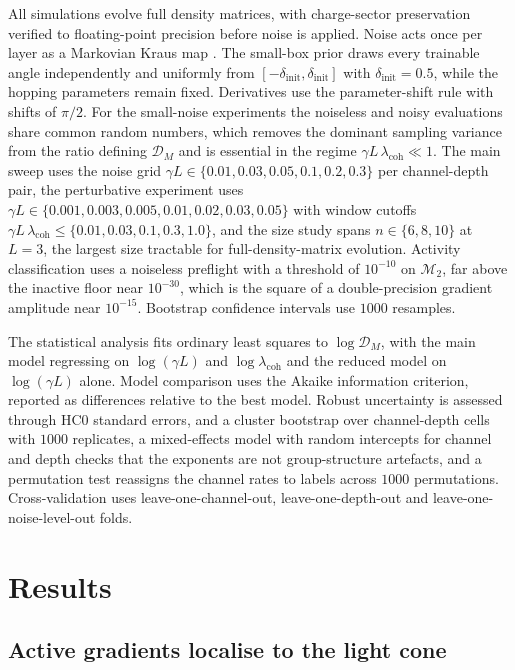 \documentclass{article}
\newcommand{\Mtwo}{\mathcal{M}_2}
\newcommand{\DM}{\mathcal{D}_M}
\newcommand{\lcoh}{\lambda_{\mathrm{coh}}}
\begin{document}
All simulations evolve full density matrices, with charge-sector preservation verified to floating-point precision before noise is applied. Noise acts once per layer as a Markovian Kraus map \cite{lindblad1976,gks1976,breuerpetruccione2002,nielsenchuang2010}. The small-box prior draws every trainable angle independently and uniformly from $[-\delta_{\mathrm{init}},\delta_{\mathrm{init}}]$ with $\delta_{\mathrm{init}}=0.5$, while the hopping parameters remain fixed. Derivatives use the parameter-shift rule with shifts of $\pi/2$. For the small-noise experiments the noiseless and noisy evaluations share common random numbers, which removes the dominant sampling variance from the ratio defining $\DM$ and is essential in the regime $\gamma L\,\lcoh\ll1$. The main sweep uses the noise grid $\gamma L\in\{0.01,0.03,0.05,0.1,0.2,0.3\}$ per channel-depth pair, the perturbative experiment uses $\gamma L\in\{0.001,0.003,0.005,0.01,0.02,0.03,0.05\}$ with window cutoffs $\gamma L\,\lcoh\leq\{0.01,0.03,0.1,0.3,1.0\}$, and the size study spans $n\in\{6,8,10\}$ at $L=3$, the largest size tractable for full-density-matrix evolution. Activity classification uses a noiseless preflight with a threshold of $10^{-10}$ on $\Mtwo$, far above the inactive floor near $10^{-30}$, which is the square of a double-precision gradient amplitude near $10^{-15}$. Bootstrap confidence intervals use $1000$ resamples.

The statistical analysis fits ordinary least squares to $\log\DM$, with the main model regressing on $\log(\gamma L)$ and $\log\lcoh$ and the reduced model on $\log(\gamma L)$ alone. Model comparison uses the Akaike information criterion, reported as differences relative to the best model. Robust uncertainty is assessed through HC0 standard errors, and a cluster bootstrap over channel-depth cells with $1000$ replicates, a mixed-effects model with random intercepts for channel and depth checks that the exponents are not group-structure artefacts, and a permutation test reassigns the channel rates to labels across $1000$ permutations. Cross-validation uses leave-one-channel-out, leave-one-depth-out and leave-one-noise-level-out folds.


\section{Results}\label{sec:results}

\subsection{Active gradients localise to the light cone}\label{sec:res-lightcone}
\end{document}
